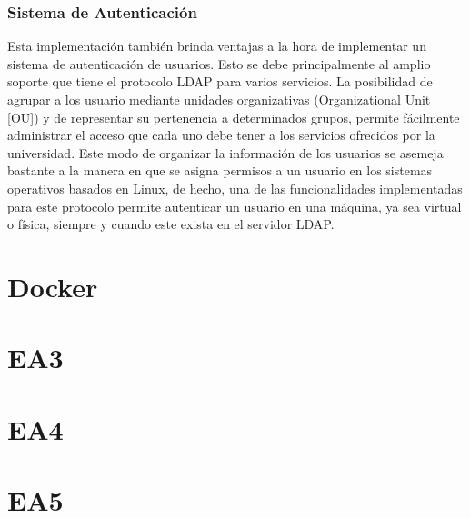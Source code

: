 \subsubsection{Sistema de Autenticaci\'on}
Esta implementaci\'on tambi\'en brinda ventajas a la hora de implementar un sistema de autenticaci\'on de usuarios. Esto se debe principalmente al amplio soporte que tiene el protocolo LDAP para varios servicios. La posibilidad de agrupar a los usuario mediante unidades organizativas (Organizational Unit [OU]) y de representar su pertenencia a determinados grupos, permite f\'acilmente administrar el acceso que cada uno debe tener a los servicios ofrecidos por la universidad. Este modo de organizar la informaci\'on de los usuarios se asemeja bastante a la manera en que se asigna permisos a un usuario en los sistemas operativos basados en Linux, de hecho, una de las funcionalidades implementadas para este protocolo permite autenticar un usuario en una m\'aquina, ya sea virtual o f\'isica, siempre y cuando este exista en el servidor LDAP.

\section{Docker}
\section{EA3}
\section{EA4}
\section{EA5}
